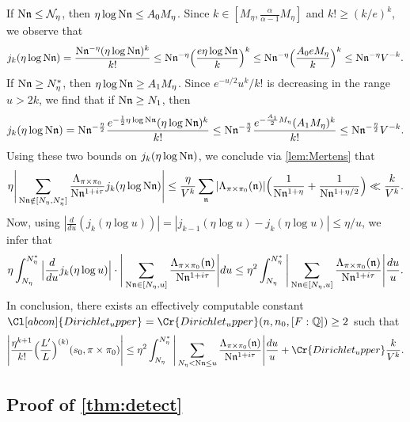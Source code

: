 \documentclass[11pt]{amsart}
\theoremstyle{remark}
\numberwithin{equation}{section}
\newcommand{\kn}{\mathfrak{n}}
\newcommand{\N}{\textnormal{N}}
\newcommand{\Q}{\mathbb{Q}}
\begin{document}
If $\N\kn\leq \mathcal{N}_{\eta}$, then $\eta\log\N\kn\leq A_0 M_{\eta}$.  Since $k\in[M_{\eta},\frac{\alpha}{\alpha-1}M_{\eta}]$ and $k!\geq (k/e)^k$, we observe that
\[
j_k(\eta\log\N\kn)=\frac{\N\kn^{-\eta}(\eta\log\N\kn)^k}{k!}\leq\N\kn^{-\eta}\Big(\frac{e\eta\log\N\kn}{k}\Big)^k\leq \N\kn^{-\eta}\Big(\frac{A_0 e M_{\eta}}{k}\Big)^k \leq \N\kn^{-\eta}V^{-k}.
\]
If $\N\kn\geq N_{\eta}^*$, then $\eta\log\N\kn\geq A_1 M_{\eta}$.  Since $e^{-u/2}u^k/k!$ is decreasing in the range $u>2k$, we find that if $\N\kn\geq N_1$, then
\[
j_k(\eta\log\N\kn)=\N\kn^{-\frac{\eta}{2}}\frac{e^{-\frac{1}{2}\eta\log\N\kn}(\eta\log\N\kn)^k}{k!}\leq \N\kn^{-\frac{\eta}{2}}\frac{e^{-\frac{A_1}{2}M_{\eta}}(A_1 M_{\eta})^k}{k!}\leq \N\kn^{-\frac{\eta}{2}}V^{-k}.
\]
Using these two bounds on $j_k(\eta\log\N\kn)$, we conclude via \cref{lem:Mertens} that
\[
\eta\Bigg|\sum_{\N\kn\notin[N_{\eta},N_{\eta}^*]}\frac{\Lambda_{\pi\times\pi_0}}{\N\kn^{1+i\tau}}j_k(\eta\log\N\kn)\Bigg|\leq \frac{\eta}{V^k}\sum_{\kn}|\Lambda_{\pi\times\pi_0}(\kn)|\Big(\frac{1}{\N\kn^{1+\eta}}+\frac{1}{\N\kn^{1+\eta/2}}\Big)\ll\frac{k}{V^k}.
\]
Now, using $|\frac{d}{du}(j_k(\eta\log u))|=|j_{k-1}(\eta\log u)-j_k(\eta\log u)|\leq \eta/u$, we infer that
\[
\eta\int_{N_{\eta}}^{N_{\eta}^*}\Big|\frac{d}{du}j_k(\eta\log u)\Big|\cdot\Bigg|\sum_{\N\kn\in[N_{\eta},u]}\frac{\Lambda_{\pi\times\pi_0}(\kn)}{\N\kn^{1+i\tau}}\Bigg|du\leq \eta^2 \int_{N_{\eta}}^{N_{\eta}^*}\Bigg|\sum_{\N\kn\in[N_{\eta},u]}\frac{\Lambda_{\pi\times\pi_0}(\kn)}{\N\kn^{1+i\tau}}\Bigg|\frac{du}{u}.
\]
In conclusion, there exists an effectively computable constant $\Cl[abcon]{Dirichlet_upper}=\Cr{Dirichlet_upper}(n,n_0,[F:\Q])\geq 2$ such that
\begin{equation}
\label{eqn:upper_bound_high_deriv}
\Bigg|\frac{\eta^{k+1}}{k!}\Big(\frac{L'}{L}\Big)^{(k)}(s_0,\pi\times\pi_0)\Bigg|\leq \eta^2\int_{N_{\eta}}^{N_{\eta}^*}\Bigg|\sum_{N_{\eta}<\N\kn\leq u}\frac{\Lambda_{\pi\times\pi_0}(\kn)}{\N\kn^{1+i\tau}}\Bigg|\frac{du}{u}+\Cr{Dirichlet_upper}\frac{k}{V^k}.
\end{equation}

\subsection{Proof of \cref{thm:detect}}
\end{document}
